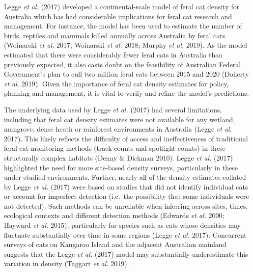 \documentclass[11pt,a4paper,titlepage,twoside,openright]{style/unimelbthesis}
\begin{document}
\begin{mainmatter}
Legge \emph{et al.} (2017) developed a continental-scale model of feral cat density for Australia which has had considerable implications for feral cat research and management. For instance, the model has been used to estimate the number of birds, reptiles and mammals killed annually across Australia by feral cats (Woinarski \emph{et al.} 2017; Woinarski \emph{et al.} 2018; Murphy \emph{et al.} 2019). As the model estimated that there were considerably fewer feral cats in Australia than previously expected, it also casts doubt on the feasibility of Australian Federal Government's plan to cull two million feral cats between 2015 and 2020 (Doherty \emph{et al.} 2019). Given the importance of feral cat density estimates for policy, planning and management, it is vital to verify and refine the model's predictions.

The underlying data used by Legge \emph{et al.} (2017) had several limitations, including that feral cat density estimates were not available for any wetland, mangrove, dense heath or rainforest environments in Australia (Legge \emph{et al.} 2017). This likely reflects the difficulty of access and ineffectiveness of traditional feral cat monitoring methods (track counts and spotlight counts) in these structurally complex habitats (Denny \& Dickman 2010). Legge \emph{et al.} (2017) highlighted the need for more site-based density surveys, particularly in these under-studied environments. Further, nearly all of the density estimates collated by Legge \emph{et al.} (2017) were based on studies that did not identify individual cats or account for imperfect detection (i.e.~the possibility that some individuals were not detected). Such methods can be unreliable when inferring across sites, times, ecological contexts and different detection methods (Edwards \emph{et al.} 2000; Hayward \emph{et al.} 2015), particularly for species such as cats whose densities may fluctuate substantially over time in some regions (Legge \emph{et al.} 2017). Concurrent surveys of cats on Kangaroo Island and the adjacent Australian mainland suggests that the Legge \emph{et al.} (2017) model may substantially underestimate this variation in density (Taggart \emph{et al.} 2019).


\end{mainmatter}
\end{document}
